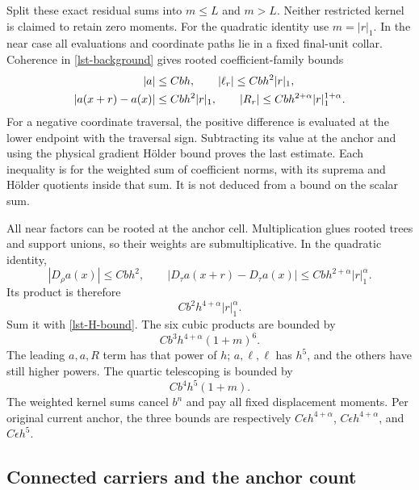 Split these exact residual sums into \(m\le L\) and \(m>L\).
Neither restricted kernel is claimed to retain zero moments.
For the quadratic identity use \(m=|r|_1\).
In the near case all evaluations and coordinate paths lie
in a fixed final-unit collar. Coherence in
\eqref{lst-background} gives rooted coefficient-family bounds
\begin{align}
 |a|&\le Cbh,\qquad
 |\ell_r|\le Cbh^2|r|_1,\notag\\
 |a(x+r)-a(x)|&\le Cbh^2|r|_1,\qquad
 |R_r|\le Cbh^{2+\alpha}|r|_1^{1+\alpha}.
 \label{lst-near-fields}
\end{align}
For a negative coordinate traversal, the positive difference
is evaluated at the lower endpoint with the traversal sign.
Subtracting its value at the anchor and using the physical
gradient H\"older bound proves the last estimate.
Each inequality is for the weighted sum of coefficient
norms, with its suprema and H\"older quotients inside that
sum. It is not deduced from a bound on the scalar sum.

All near factors can be rooted at the anchor cell.
Multiplication glues rooted trees and support unions, so
their weights are submultiplicative. In the quadratic
identity,
\[
 |D_\rho a(x)|\le Cbh^2,\qquad
 |D_\tau a(x+r)-D_\tau a(x)|
                      \le Cbh^{2+\alpha}|r|_1^\alpha.
\]
Its product is therefore
\begin{equation}
 Cb^2h^{4+\alpha}|r|_1^\alpha.
 \label{lst-near-quadratic}
\end{equation}
Sum it with \eqref{lst-H-bound}. The six cubic products
are bounded by
\begin{equation}
 Cb^3h^{4+\alpha}(1+m)^6.
 \label{lst-near-cubic}
\end{equation}
The leading \(a,a,R\) term has that power of \(h\);
\(a,\ell,\ell\) has \(h^5\), and the others have still
higher powers. The quartic telescoping is bounded by
\begin{equation}
 Cb^4h^5(1+m).
 \label{lst-near-quartic}
\end{equation}
The weighted kernel sums cancel \(b^n\) and pay all
fixed displacement moments. Per original current anchor,
the three bounds are respectively
\(C\epsilon h^{4+\alpha}\),
\(C\epsilon h^{4+\alpha}\), and \(C\epsilon h^5\).

\subsection{Connected carriers and the anchor count}
\label{lst-carriers-section}

